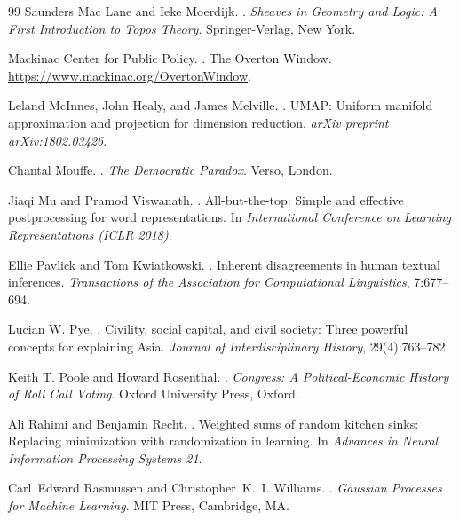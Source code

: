 \documentclass[12pt]{article}
\begin{document}
\begin{thebibliography}{99}
Saunders Mac Lane and Ieke Moerdijk.
.
\newblock \emph{Sheaves in Geometry and Logic: A First Introduction to Topos Theory}.
\newblock Springer-Verlag, New York.

Mackinac Center for Public Policy.
.
\newblock The Overton Window.
\newblock \url{https://www.mackinac.org/OvertonWindow}.

Leland McInnes, John Healy, and James Melville.
.
\newblock UMAP: Uniform manifold approximation and projection for dimension reduction.
\newblock \emph{arXiv preprint arXiv:1802.03426}.

Chantal Mouffe.
.
\newblock \emph{The Democratic Paradox}.
\newblock Verso, London.

Jiaqi Mu and Pramod Viswanath.
.
\newblock All-but-the-top: Simple and effective postprocessing for word representations.
\newblock In \emph{International Conference on Learning Representations (ICLR 2018)}.

Ellie Pavlick and Tom Kwiatkowski.
.
\newblock Inherent disagreements in human textual inferences.
\newblock \emph{Transactions of the Association for Computational Linguistics}, 7:677--694.

Lucian W. Pye.
.
\newblock Civility, social capital, and civil society: Three powerful concepts for explaining Asia.
\newblock \emph{Journal of Interdisciplinary History}, 29(4):763--782.

Keith T. Poole and Howard Rosenthal.
.
\newblock \emph{Congress: A Political-Economic History of Roll Call Voting}.
\newblock Oxford University Press, Oxford.

Ali Rahimi and Benjamin Recht.
.
\newblock Weighted sums of random kitchen sinks: Replacing minimization with randomization in learning.
\newblock In \emph{Advances in Neural Information Processing Systems 21}.

Carl~Edward Rasmussen and Christopher~K.~I. Williams.
.
\newblock \emph{Gaussian Processes for Machine Learning}.
\newblock MIT Press, Cambridge, MA.


\end{thebibliography}
\end{document}
